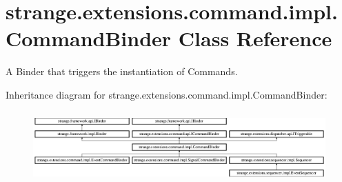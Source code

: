 \hypertarget{classstrange_1_1extensions_1_1command_1_1impl_1_1_command_binder}{\section{strange.\-extensions.\-command.\-impl.\-Command\-Binder Class Reference}
\label{classstrange_1_1extensions_1_1command_1_1impl_1_1_command_binder}
}


A Binder that triggers the instantiation of Commands.  


Inheritance diagram for strange.\-extensions.\-command.\-impl.\-Command\-Binder\-:\begin{figure}[H]
\begin{center}
\leavevmode
\includegraphics[height=2.753196cm]{classstrange_1_1extensions_1_1command_1_1impl_1_1_command_binder}
\end{center}
\end{figure}
